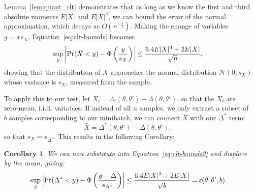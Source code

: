 \documentclass{article}
\newtheorem{corollary}{Corollary}
\begin{document}


Lemma~\ref{lem:quant_clt} demonstrates that as long as we know the first and
third absolute moments $E|X|$ and $E|X|^3$, we can bound the error of the normal
approximation, which decays as $O(n^{-\frac{1}{2}})$. Making the change of
variables $y = x s_X$, Equation~\ref{eq:clt-bounds} becomes
\begin{equation}\label{eq:clt-bounds2}
   \sup_y\left|{\rm Pr}(\bar{X}< y) - \Phi\left(\frac{y}{s_X}\right)\right| \leq \frac{6.4E|X|^3+2E|X|}{\sqrt{n}},
\end{equation}
showing that the distribution of $\bar{X}$ approaches the normal distribution
$\mathcal{N}(0,s_X)$ whose variance is $s_X$,
measured from the sample.

To apply this to our test, let $X_i = \Lambda_i(\theta,\theta') -
\Lambda(\theta,\theta')$, so that the $X_i$ are zero-mean, i.i.d. variables. If
instead of all $n$ samples, we only extract a subset of $b$ samples
corresponding to our minibatch, we can connect $\bar{X}$ with our $\Delta^*$
term:
\begin{equation}\label{eq:x-hat}
    \bar{X} = \Delta^*(\theta,\theta') - \Delta(\theta,\theta'),
\end{equation}
so that $s_X = s_{\Delta^*}$.
This results in the following Corollary:

\begin{corollary}\label{cor:our_bound_delta_prime}
We can now substitute into Equation~\ref{eq:clt-bounds2} and displace by the mean, giving:
\begin{equation}\label{eq:clt-bounds3}
    \sup_y\left|{\rm Pr}(\Delta^*< y) - \Phi\left(\frac{y-\Delta}{s_{\Delta^*}}\right)\right| \leq \frac{6.4E|X|^3+2E|X|}{\sqrt{b}} = \epsilon(\theta,\theta',b)
\end{equation}
\end{corollary}
\end{document}
